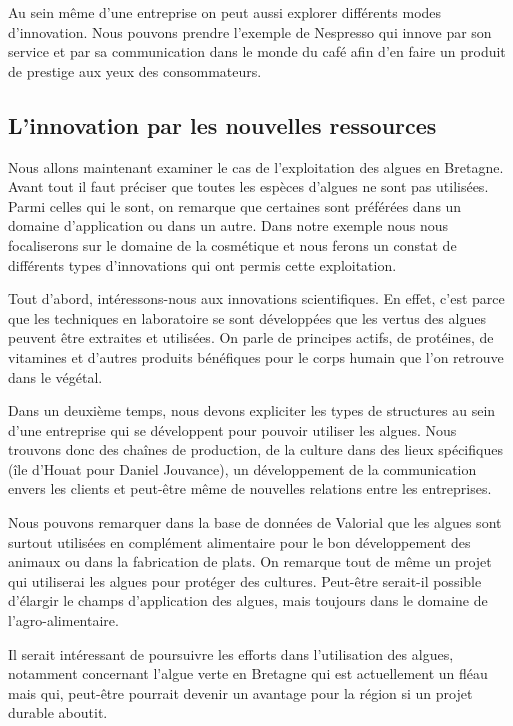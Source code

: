 \documentclass[a4paper,10pt]{report}
\begin{document}
			Au sein même d’une entreprise on peut aussi explorer différents modes d’innovation. Nous pouvons prendre l’exemple de Nespresso qui innove par son service et par sa communication dans le monde du café afin d’en faire un produit de prestige aux yeux des consommateurs.
				
		\subsection{L'innovation par les nouvelles ressources}
			Nous allons maintenant examiner le cas de l’exploitation des algues en Bretagne.
			Avant tout il faut préciser que toutes les espèces d’algues ne sont pas utilisées. Parmi celles qui le sont, on remarque que certaines sont préférées dans un domaine d’application ou dans un autre. Dans notre exemple nous nous focaliserons sur le domaine de la cosmétique et nous ferons un constat de différents types d’innovations qui ont permis cette exploitation.
			
			Tout d’abord, intéressons-nous aux innovations scientifiques. En effet, c’est parce que les techniques en laboratoire se sont développées que les vertus des algues peuvent être extraites et utilisées. On parle de principes actifs, de protéines, de vitamines et d’autres produits bénéfiques pour le corps humain que l’on retrouve dans le végétal.
			
			Dans un deuxième temps, nous devons expliciter les types de structures au sein d’une entreprise qui se développent pour pouvoir utiliser les algues. Nous trouvons donc des chaînes de production, de la culture dans des lieux spécifiques (île d’Houat pour Daniel Jouvance), un développement de la communication envers les clients et peut-être même de nouvelles relations entre les entreprises.
			
			Nous pouvons remarquer dans la base de données de Valorial que les algues sont surtout utilisées en complément alimentaire pour le bon développement des animaux ou dans la fabrication de plats. On remarque tout de même un projet qui utiliserai les algues pour protéger des cultures. Peut-être serait-il possible d’élargir le champs d’application des algues, mais toujours dans le domaine de l’agro-alimentaire. 
			
			Il serait intéressant de poursuivre les efforts dans l’utilisation des algues, notamment concernant l’algue verte en Bretagne qui est actuellement un fléau mais qui, peut-être pourrait devenir un avantage pour la région si un projet durable aboutit. 
			
\end{document}
